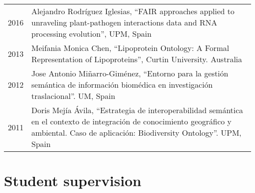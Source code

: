 \documentclass[11pt,fullpage]{article}
\begin{document}
\begin{longtable}{p{0.5in}|p{5.5in}}

2016 & Alejandro Rodr\'iguez Iglesias, ``FAIR approaches applied to unraveling plant-pathogen interactions data and RNA processing evolution'', UPM, Spain \\

2013 & Meifania Monica Chen, ``Lipoprotein Ontology: A Formal Representation of Lipoproteins'', Curtin University. Australia \\

2012 & Jose Antonio Mi\~narro-Gim\'enez, ``Entorno para la gesti\'on sem\'antica de informaci\'on biom\'edica en investigaci\'on traslacional''. UM, Spain \\

2011 & Doris Mej\'ia \'Avila, ``Estrategia de interoperabilidad sem\'antica en el contexto de integraci\'on de conocimiento geogr\'afico y ambiental. Caso de aplicaci\'on: Biodiversity Ontology''. UPM, Spain \\

\end{longtable}

\section*{Student supervision}
\end{document}
